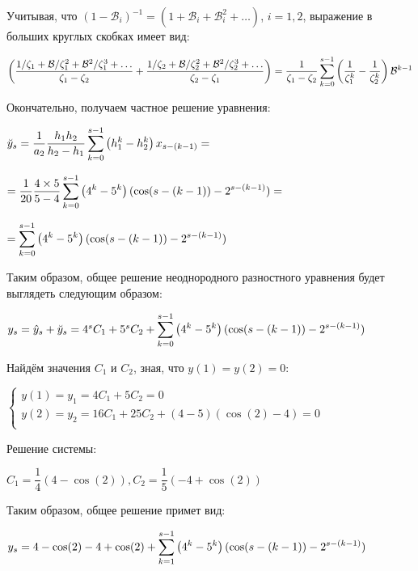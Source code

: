\documentclass[14pt,fleqn]{extarticle}
\begin{document}
	Учитывая, что $(1-\mathcal{B}_i)^{-1} = (1+\mathcal{B}_i+\mathcal{B}_i^2+\dots)$, $i=1,2$, выражение в больших круглых скобках имеет вид:
	\begin{center}
		$\left(\dfrac{1/\zeta_1 + \mathcal{B}/\zeta_1^2 + \mathcal{B}^2/\zeta_1^3 + \dots}{\zeta_1 - \zeta_2} + \dfrac{1/\zeta_2 + \mathcal{B}/\zeta_2^2 + \mathcal{B}^2/\zeta_2^3 + \dots}{\zeta_2 - \zeta_1}\right) = \dfrac{1}{\zeta_1-\zeta_2} \smashoperator[r]{\sum_{k=0}^{s-1}}\left(\dfrac{1}{\zeta_1^k} - \dfrac{1}{\zeta_2^k}\right)\mathcal{B}^{k-1}$
	\end{center}
	\newpage
	Окончательно, получаем частное решение уравнения:
	\begin{center}
		$\breve{y}_s = \dfrac{1}{a_2} \dfrac{h_1 h_2}{h_2-h_1}\smashoperator[r]{\sum_{k=0}^{s-1}}\left(h_1^k-h_2^k\right)x_{s-(k-1)} = $
	\end{center}
	\begin{center}
		$ = \dfrac{1}{20} \dfrac{4 \times 5}{5-4}\smashoperator[r]{\sum_{k=0}^{s-1}}\left(4^k-5^k\right)(\cos(s-(k-1))-2^{s-(k-1)}) = $
	\end{center}
	\begin{center}
		$ = \smashoperator[r]{\sum_{k=0}^{s-1}}\left(4^k-5^k\right)(\cos(s-(k-1))-2^{s-(k-1)})$
	\end{center}
	Таким образом, общее решение неоднородного разностного уравнения будет выглядеть следующим образом:
	\begin{center}
		$y_s = \hat{y}_s + \breve{y}_s = 4^sC_1 + 5^sC_2 + \smashoperator[r]{\sum_{k=0}^{s-1}}\left(4^k-5^k\right)(\cos(s-(k-1))-2^{s-(k-1)})$
	\end{center}
	Найдём значения $C_1$ и $C_2$, зная, что $y(1) = y(2) = 0$:
	\begin{center}
		$\begin{cases}
			y(1) = y_1 = 4C_1 + 5C_2 = 0 \\
			y(2) = y_2 = 16C_1 + 25C_2 + (4-5)(\cos(2) - 4) = 0\\
		\end{cases}$
	\end{center}
	Решение системы:
	\begin{center}
		$C_1 = \dfrac{1}{4}(4-\cos(2)), C_2 = \dfrac{1}{5}(-4+\cos(2))$
	\end{center}
	Таким образом, общее решение примет вид:
	\begin{center}
		$y_s = 4-\cos(2) - 4 + \cos(2) + \smashoperator[r]{\sum_{k=1}^{s-1}}\left(4^k-5^k\right)(\cos(s-(k-1))-2^{s-(k-1)})$
	\end{center}
	\newpage
\end{document}
